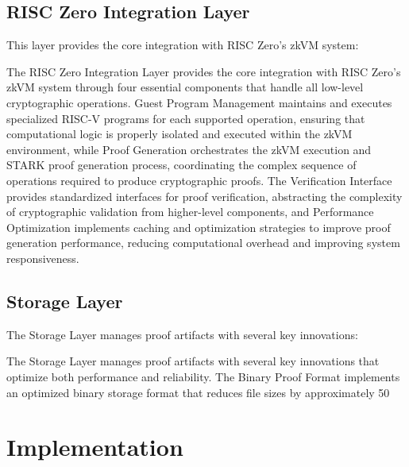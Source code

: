 \documentclass[11pt]{article}
\begin{document}
\subsection{RISC Zero Integration Layer}

This layer provides the core integration with RISC Zero's zkVM system:

The RISC Zero Integration Layer provides the core integration with RISC Zero's zkVM system through four essential components that handle all low-level cryptographic operations. Guest Program Management maintains and executes specialized RISC-V programs for each supported operation, ensuring that computational logic is properly isolated and executed within the zkVM environment, while Proof Generation orchestrates the zkVM execution and STARK proof generation process, coordinating the complex sequence of operations required to produce cryptographic proofs. The Verification Interface provides standardized interfaces for proof verification, abstracting the complexity of cryptographic validation from higher-level components, and Performance Optimization implements caching and optimization strategies to improve proof generation performance, reducing computational overhead and improving system responsiveness.

\subsection{Storage Layer}

The Storage Layer manages proof artifacts with several key innovations:

The Storage Layer manages proof artifacts with several key innovations that optimize both performance and reliability. The Binary Proof Format implements an optimized binary storage format that reduces file sizes by approximately 50%

\section{Implementation}
\label{sec:implementation}
\end{document}
